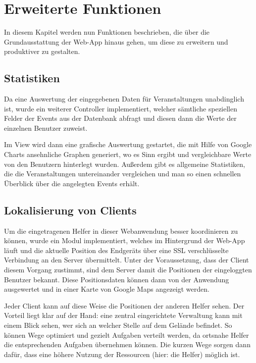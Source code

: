 \chapter{Erweiterte Funktionen}
In diesem Kapitel werden nun Funktionen beschrieben, die über die Grundausstattung der Web-App hinaus gehen, um diese zu erweitern und produktiver zu gestalten. 

\section{Statistiken}
Da eine Auswertung der eingegebenen Daten für Veranstaltungen unabdinglich ist, wurde ein weiterer Controller implementiert, welcher sämtliche speziellen Felder der Events aus der Datenbank abfragt und diesen dann die Werte der einzelnen Benutzer zuweist.\par

Im View wird dann eine grafische Auswertung gestartet, die mit Hilfe von Google Charts ansehnliche Graphen generiert, wo es Sinn ergibt und vergleichbare Werte von den Benutzern hinterlegt wurden. Außerdem gibt es allgemeine Statistiken, die die Veranstaltungen untereinander vergleichen und man so einen schnellen Überblick über die angelegten Events erhält.

\section{Lokalisierung von Clients}
Um die eingetragenen Helfer in dieser Webanwendung besser koordinieren zu können, wurde ein Modul implementiert, welches im Hintergrund der Web-App läuft und die aktuelle Position des Endgeräts über eine SSL verschlüsselte Verbindung an den Server übermittelt. Unter der Voraussetzung, dass der Client diesem Vorgang zustimmt, sind dem Server damit die Positionen der eingeloggten Benutzer bekannt. Diese Positionsdaten können dann von der Anwendung ausgewertet und in einer Karte von Google Maps angezeigt werden.\par

Jeder Client kann auf diese Weise die Positionen der anderen Helfer sehen. Der Vorteil liegt klar auf der Hand: eine zentral eingerichtete Verwaltung kann mit einem Blick sehen, wer sich an welcher Stelle auf dem Gelände befindet. So können Wege optimiert und gezielt Aufgaben verteilt werden, da ortsnahe Helfer die entsprechenden Aufgaben übernehmen können. Die kurzen Wege sorgen dann dafür, dass eine höhere Nutzung der Ressourcen (hier: die Helfer) möglich ist.\par

